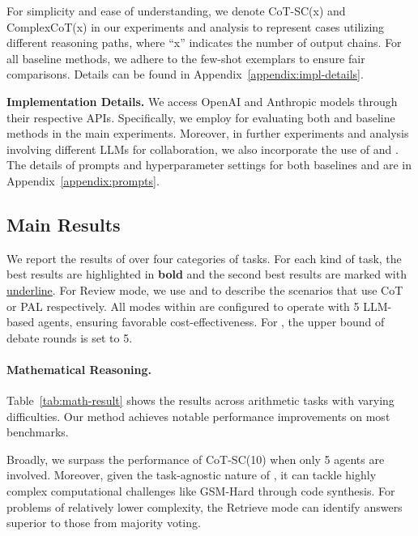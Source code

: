For simplicity and ease of understanding, 
we denote CoT-SC(x) and ComplexCoT(x) in our experiments and analysis to represent cases utilizing different reasoning paths, 
where ``x'' indicates the number of output chains. 
For all baseline methods, we adhere to the few-shot exemplars to ensure fair comparisons. Details can be found in Appendix~\ref{appendix:impl-details}.

\textbf{Implementation Details.}
We access OpenAI and Anthropic models through their respective APIs. 
Specifically, we employ \turbo for evaluating both \ours and baseline methods in the main experiments.
Moreover, 
in further experiments and analysis involving different LLMs for collaboration, 
we also incorporate the use of \gpt and \claude.
The details of prompts and hyperparameter settings for both baselines and \ours are in Appendix~\ref{appendix:prompts}.

\subsection{Main Results}
\label{sec:main-results}

We report the results of \ours over four categories of tasks. 
For each kind of task, 
the best results are highlighted in \textbf{bold} and the second best results are marked with \underline{underline}.
For Review mode, 
we use \crnl and \crcode to describe the scenarios that use CoT or PAL respectively.
All modes within \ours are configured to operate with 5 LLM-based agents, 
ensuring favorable cost-effectiveness.
For \crd, the upper bound of debate rounds is set to 5.

\paragraph{Mathematical Reasoning.} 
Table~\ref{tab:math-result} shows the results across arithmetic tasks with varying difficulties.
Our method achieves notable performance improvements on most benchmarks.



Broadly,
we surpass the performance of CoT-SC(10) when only 5 agents are involved.
Moreover, 
given the task-agnostic nature of \ours,
it can tackle highly complex computational challenges like GSM-Hard through code synthesis.
For problems of relatively lower complexity, 
the Retrieve mode can identify answers superior to those from majority voting.

